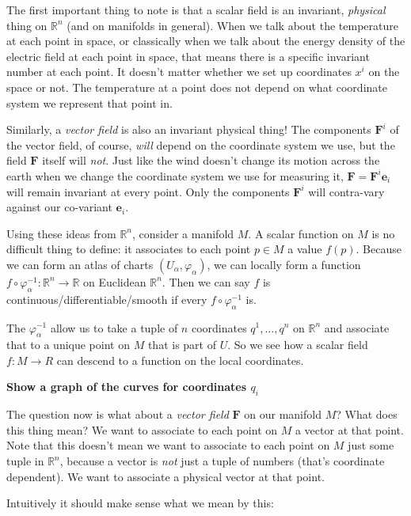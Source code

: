 	The first important thing to note is that a scalar field is an invariant, \emph{physical} thing on $\mathbb{R}^n$ (and on manifolds in general). When we talk about the temperature at each point in space, or classically when we talk about the energy density of the electric field at each point in space, that means there is a specific invariant number at each point. It doesn't matter whether we set up coordinates $x^i$ on the space or not. The temperature at a point does not depend on what coordinate system we represent that point in. 
	
	Similarly, a \emph{vector field} is also an invariant physical thing! The components $\mathbf F^i$ of the vector field, of course, \emph{will} depend on the coordinate system we use, but the field $\mathbf{F}$ itself will \emph{not}. Just like the wind doesn't change its motion across the earth when we change the coordinate system we use for measuring it, $\mathbf{F} = \mathbf{F}^i \mathbf e_i$ will remain invariant at every point. Only the components $\mathbf{F}^i$ will contra-vary against our co-variant $\mathbf e_i$.
	
	Using these ideas from $\mathbb{R}^n$, consider a manifold $M$. A scalar function on $M$ is no difficult thing to define: it associates to each point $p \in M$ a value $f(p)$. Because we can form an atlas of charts $(U_\alpha, \varphi_\alpha)$, we can locally form a function $f \circ \varphi_\alpha^{-1} : \mathbb{R}^n \rightarrow \mathbb R$ on Euclidean $\mathbb{R}^n$. Then we can say $f$ is continuous/differentiable/smooth if every $f \circ \varphi_\alpha^{-1}$ is.
	
	The $\varphi_\alpha^{-1}$ allow us to take a tuple of $n$ coordinates $q^1, \dots, q^n$ on $\mathbb{R}^n$ and associate that to a unique point on $M$ that is part of $U$. So we see how a scalar field $f: M \rightarrow R$ can descend to a function on the local coordinates. 
	
	\textbf{Show a graph of the curves for coordinates $q_i$}
	
	The question now is what about a \emph{vector field} $\mathbf{F}$ on our manifold $M$? What does this thing mean? We want to associate to each point on $M$ a vector at that point. Note that this doesn't mean we want to associate to each point on $M$ just some tuple in $\mathbb{R}^n$, because a vector is \emph{not} just a tuple of numbers (that's coordinate dependent). We want to associate a physical vector at that point. 
	
	 Intuitively it should make sense what we mean by this: 
	
